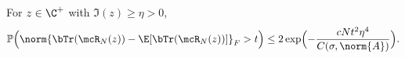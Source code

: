 \begin{lemma}\label{lem:concentration}
For $z \in \C^+$ with $\Im(z) \geq \eta > 0$,
\[
\mathbb{P}\Bigl(\norm{\bTr(\mcR_N(z)) - \E[\bTr(\mcR_N(z))]}_F > t\Bigr) \leq 2 \exp\Bigl(-\frac{cNt^2\eta^4}{C(\sigma, \norm{A})}\Bigr).
\]
\end{lemma}
